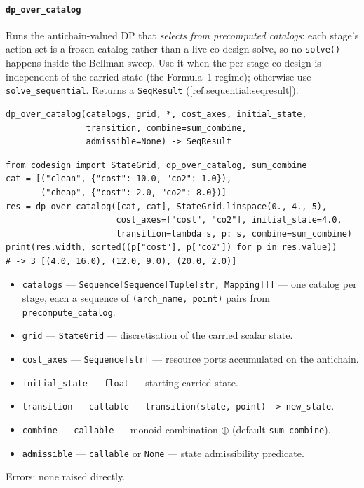 \documentclass[11pt,a4paper]{article}
\begin{document}
\paragraph{\texttt{dp\_over\_catalog}}\label{ref:sequential:dp_over_catalog}
Runs the antichain-valued DP that \emph{selects from precomputed catalogs}:
each stage's action set is a frozen catalog rather than a live co-design
solve, so no \texttt{solve()} happens inside the Bellman sweep. Use it when
the per-stage co-design is independent of the carried state (the Formula~1
regime); otherwise use \texttt{solve\_sequential}. Returns a
\texttt{SeqResult} (\ref{ref:sequential:seqresult}).
\begin{lstlisting}
dp_over_catalog(catalogs, grid, *, cost_axes, initial_state,
                transition, combine=sum_combine,
                admissible=None) -> SeqResult
\end{lstlisting}
\begin{lstlisting}
from codesign import StateGrid, dp_over_catalog, sum_combine
cat = [("clean", {"cost": 10.0, "co2": 1.0}),
       ("cheap", {"cost": 2.0, "co2": 8.0})]
res = dp_over_catalog([cat, cat], StateGrid.linspace(0., 4., 5),
                      cost_axes=["cost", "co2"], initial_state=4.0,
                      transition=lambda s, p: s, combine=sum_combine)
print(res.width, sorted((p["cost"], p["co2"]) for p in res.value))
# -> 3 [(4.0, 16.0), (12.0, 9.0), (20.0, 2.0)]
\end{lstlisting}
\begin{itemize}[nosep]
  \item \texttt{catalogs} --- \texttt{Sequence[Sequence[Tuple[str,
    Mapping]]]} --- one catalog per stage, each a sequence of
    \texttt{(arch\_name, point)} pairs from \texttt{precompute\_catalog}.
  \item \texttt{grid} --- \texttt{StateGrid} --- discretisation of the
    carried scalar state.
  \item \texttt{cost\_axes} --- \texttt{Sequence[str]} --- resource ports
    accumulated on the antichain.
  \item \texttt{initial\_state} --- \texttt{float} --- starting carried
    state.
  \item \texttt{transition} --- \texttt{callable} ---
    \texttt{transition(state, point) -> new\_state}.
  \item \texttt{combine} --- \texttt{callable} --- monoid combination
    $\oplus$ (default \texttt{sum\_combine}).
  \item \texttt{admissible} --- \texttt{callable} or \texttt{None} --- state
    admissibility predicate.
\end{itemize}
Errors: none raised directly.
\end{document}
